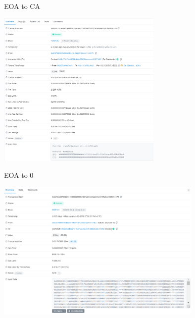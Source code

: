 \documentclass[handout]{beamer}
\begin{document}
\begin{frame}{EOA to CA}

\center
	\includegraphics[width=8cm]{../assets/images/EOA_to_CA}

\end{frame}

\begin{frame}{EOA to 0}

\center
	\includegraphics[width=10cm]{../assets/images/EOA_to_0}

\end{frame}
\end{document}
